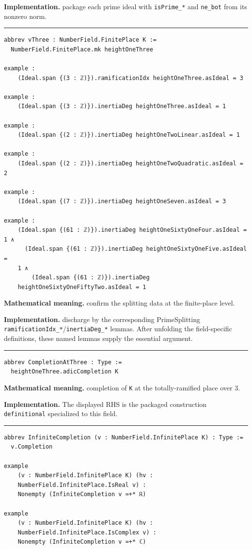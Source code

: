 \documentclass[UTF8,a4paper,11pt,fontset=fandol]{ctexart}
\theoremstyle{definition}
\newcommand{\statementsep}{\par\medskip\hrule\medskip}
\begin{document}
\noindent\textbf{Implementation.} package each prime ideal with \texttt{isPrime\_\allowbreak{}*} and \texttt{ne\_\allowbreak{}bot} from its nonzero norm.\par
\statementsep
\begin{verbatim}
abbrev vThree : NumberField.FinitePlace K :=
  NumberField.FinitePlace.mk heightOneThree

example :
    (Ideal.span {(3 : ℤ)}).ramificationIdx heightOneThree.asIdeal = 3

example :
    (Ideal.span {(3 : ℤ)}).inertiaDeg heightOneThree.asIdeal = 1

example :
    (Ideal.span {(2 : ℤ)}).inertiaDeg heightOneTwoLinear.asIdeal = 1

example :
    (Ideal.span {(2 : ℤ)}).inertiaDeg heightOneTwoQuadratic.asIdeal = 2

example :
    (Ideal.span {(7 : ℤ)}).inertiaDeg heightOneSeven.asIdeal = 3

example :
    (Ideal.span {(61 : ℤ)}).inertiaDeg heightOneSixtyOneFour.asIdeal = 1 ∧
      (Ideal.span {(61 : ℤ)}).inertiaDeg heightOneSixtyOneFive.asIdeal =
    1 ∧
        (Ideal.span {(61 : ℤ)}).inertiaDeg
    heightOneSixtyOneFiftyTwo.asIdeal = 1
\end{verbatim}
\noindent\textbf{Mathematical meaning.} confirm the splitting data at the finite-place level.\par
\noindent\textbf{Implementation.} discharge by the corresponding PrimeSplitting \texttt{ramificationIdx\_\allowbreak{}*}/\texttt{inertiaDeg\_\allowbreak{}*} lemmas. After unfolding the field-specific definitions, these named lemmas supply the essential argument.\par
\statementsep
\begin{verbatim}
abbrev CompletionAtThree : Type :=
  heightOneThree.adicCompletion K
\end{verbatim}
\noindent\textbf{Mathematical meaning.} completion of \texttt{K} at the totally-ramified place over 3.\par
\noindent\textbf{Implementation.} The displayed RHS is the packaged construction \texttt{definitional} specialized to this field.\par
\statementsep
\begin{verbatim}
abbrev InfiniteCompletion (v : NumberField.InfinitePlace K) : Type :=
  v.Completion

example
    (v : NumberField.InfinitePlace K) (hv :
    NumberField.InfinitePlace.IsReal v) :
    Nonempty (InfiniteCompletion v ≃+* ℝ)

example
    (v : NumberField.InfinitePlace K) (hv :
    NumberField.InfinitePlace.IsComplex v) :
    Nonempty (InfiniteCompletion v ≃+* ℂ)
\end{verbatim}
\end{document}
